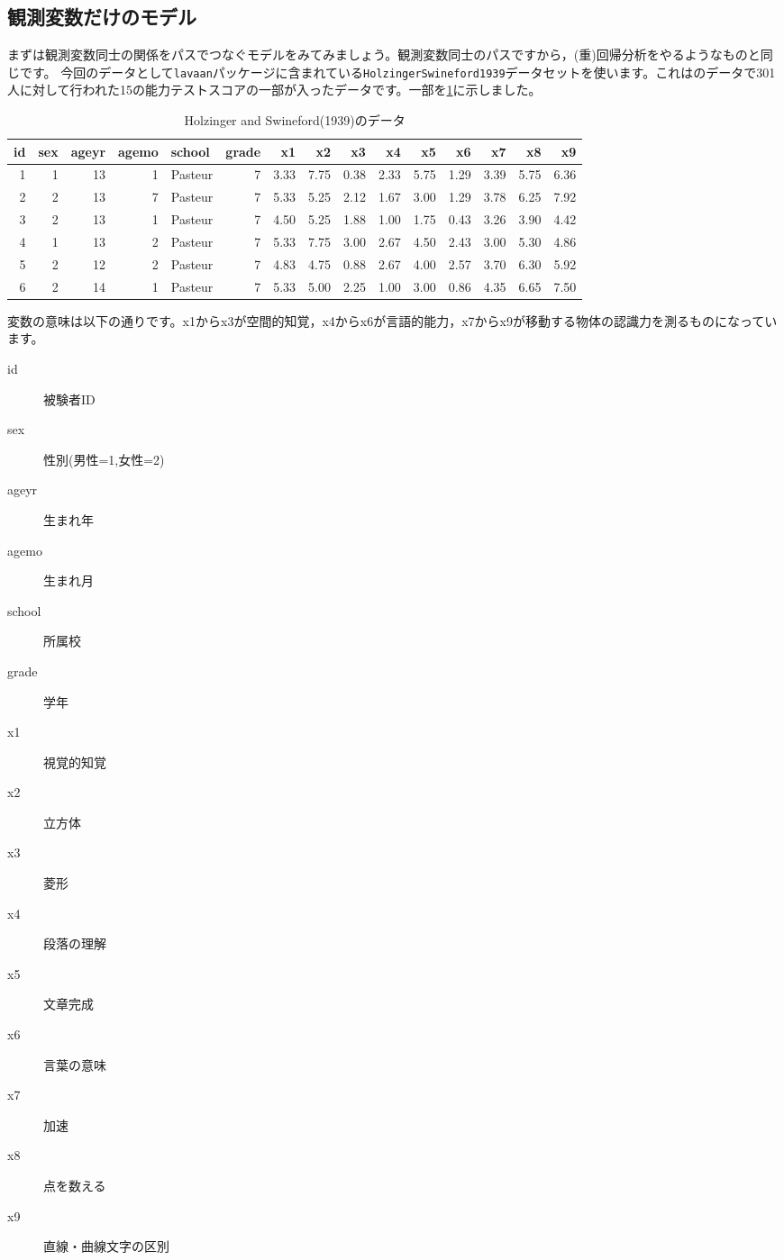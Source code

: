 \documentclass{ltjsbook}
\begin{document}
\subsection{観測変数だけのモデル}
まずは観測変数同士の関係をパスでつなぐモデルをみてみましょう。観測変数同士のパスですから，(重)回帰分析をやるようなものと同じです。
今回のデータとして\texttt{lavaan}パッケージに含まれている\texttt{HolzingerSwineford1939}データセットを使います。これは\textcite{holzinger1939study}のデータで301人に対して行われた15の能力テストスコアの一部が入ったデータです。一部を\ref{tbl::13_01}に示しました。
\begin{table}[ht]

	\caption{Holzinger and Swineford(1939)のデータ}
	\centering
	\begin{tabular}[t]{rrrrlrrrrrrrrrr}
		\hline
		id & sex & ageyr & agemo & school  & grade & x1   & x2   & x3   & x4   & x5   & x6   & x7   & x8   & x9   \\
		\hline
		1  & 1   & 13    & 1     & Pasteur & 7     & 3.33 & 7.75 & 0.38 & 2.33 & 5.75 & 1.29 & 3.39 & 5.75 & 6.36 \\
		2  & 2   & 13    & 7     & Pasteur & 7     & 5.33 & 5.25 & 2.12 & 1.67 & 3.00 & 1.29 & 3.78 & 6.25 & 7.92 \\
		3  & 2   & 13    & 1     & Pasteur & 7     & 4.50 & 5.25 & 1.88 & 1.00 & 1.75 & 0.43 & 3.26 & 3.90 & 4.42 \\
		4  & 1   & 13    & 2     & Pasteur & 7     & 5.33 & 7.75 & 3.00 & 2.67 & 4.50 & 2.43 & 3.00 & 5.30 & 4.86 \\
		5  & 2   & 12    & 2     & Pasteur & 7     & 4.83 & 4.75 & 0.88 & 2.67 & 4.00 & 2.57 & 3.70 & 6.30 & 5.92 \\
		6  & 2   & 14    & 1     & Pasteur & 7     & 5.33 & 5.00 & 2.25 & 1.00 & 3.00 & 0.86 & 4.35 & 6.65 & 7.50 \\
		\hline
	\end{tabular}
	\label{tbl::13_01}
\end{table}
変数の意味は以下の通りです。x1からx3が空間的知覚，x4からx6が言語的能力，x7からx9が移動する物体の認識力を測るものになっています。
\begin{description}
	\item[id] 被験者ID
	\item[sex] 性別(男性=1,女性=2)
	\item[ageyr] 生まれ年
	\item[agemo] 生まれ月
	\item[school] 所属校
	\item[grade] 学年
	\item[x1] 視覚的知覚
	\item[x2] 立方体
	\item[x3] 菱形
	\item[x4] 段落の理解
	\item[x5] 文章完成
	\item[x6] 言葉の意味
	\item[x7] 加速
	\item[x8] 点を数える
	\item[x9] 直線・曲線文字の区別
\end{description}
\end{document}
